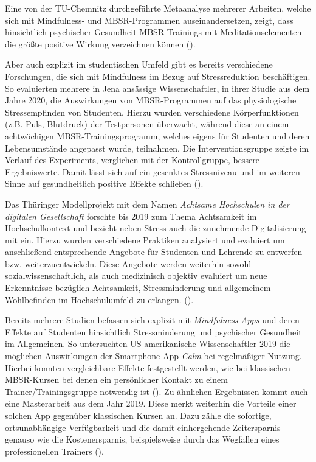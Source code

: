 \documentclass[10pt]{article}
\newcommand{\zit}[1]{(\cite{#1})}
\begin{document}
Eine von der TU-Chemnitz durchgeführte Metaanalyse mehrerer  Arbeiten, welche sich mit Mindfulness- und MBSR-Programmen auseinandersetzen, zeigt, dass hinsichtlich psychischer Gesundheit MBSR-Trainings mit Meditationselementen die größte positive Wirkung verzeichnen können \zit{MindfulnessStudy2}.

Aber auch explizit im studentischen Umfeld gibt es bereits verschiedene Forschungen, die sich mit Mindfulness im Bezug auf Stressreduktion beschäftigen. So evaluierten mehrere in Jena ansässige Wissenschaftler, in ihrer Studie aus dem Jahre 2020, die Auswirkungen von MBSR-Programmen auf das physiologische Stressempfinden von Studenten. Hierzu wurden verschiedene Körperfunktionen (z.B. Puls, Blutdruck) der Testpersonen überwacht, während diese an einem achtwöchigen MBSR-Trainingsprogramm, welches eigens für Studenten und deren Lebensumstände angepasst wurde, teilnahmen. Die Interventionsgruppe zeigte im Verlauf des Experiments, verglichen mit der Kontrollgruppe, bessere Ergebniswerte. Damit lässt sich auf ein gesenktes Stressniveau und im weiteren Sinne auf gesundheitlich positive Effekte schließen \zit{MindfulnessStudy3}.

Das Thüringer Modellprojekt mit dem Namen \textit{Achtsame Hochschulen in der digitalen Gesellschaft} forschte bis 2019 zum Thema Achtsamkeit im Hochschulkontext und bezieht neben Stress auch die zunehmende Digitalisierung mit ein. Hierzu wurden verschiedene Praktiken analysiert und evaluiert um anschließend entsprechende Angebote für Studenten und Lehrende zu entwerfen bzw. weiterzuentwickeln. Diese Angebote werden weiterhin sowohl sozialwissenschaftlich, als auch medizinisch objektiv evaluiert um neue Erkenntnisse bezüglich Achtsamkeit, Stressminderung und allgemeinem Wohlbefinden im Hochschulumfeld zu erlangen.  \zit{AchtsameHochschulen}.

Bereits mehrere Studien befassen sich explizit mit \textit{Mindfulness Apps} und deren Effekte auf Studenten hinsichtlich Stressminderung und psychischer Gesundheit im Allgemeinen. So untersuchten US-amerikanische Wissenschaftler 2019 die möglichen Auswirkungen der Smartphone-App \textit{Calm} bei regelmäßiger Nutzung. Hierbei konnten vergleichbare Effekte festgestellt werden, wie bei klassischen MBSR-Kursen bei denen ein persönlicher Kontakt zu einem Trainer/Trainingsgruppe notwendig ist \zit{MindfulnessStudy4}. Zu ähnlichen Ergebnissen kommt auch eine Masterarbeit aus dem Jahr 2019. Diese merkt weiterhin die Vorteile einer solchen App gegenüber klassischen Kursen an. Dazu zähle die sofortige, ortsunabhängige Verfügbarkeit und die damit einhergehende Zeitersparnis genauso wie die Kostenersparnis, beispielsweise durch das Wegfallen eines professionellen Trainers \zit{MindfulnessStudy5}.
\end{document}
